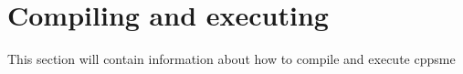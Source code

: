 \section{Compiling and executing}
This section will contain information about how to compile and execute
cppsme 



